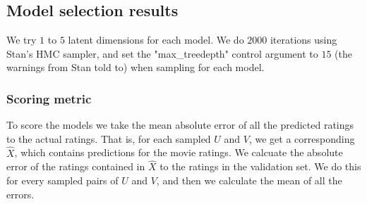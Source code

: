 \documentclass[12pt]{article}
\begin{document}
    \subsection{Model selection results}
    We try $1$ to $5$ latent dimensions for each model. We do $2000$ iterations using Stan's HMC sampler, and set the "max\_treedepth" control argument to $15$ (the warnings from Stan told to) when sampling for each model.

        \subsubsection*{Scoring metric}
        To score the models we take the mean absolute error of all the predicted ratings to the actual ratings. That is, for each sampled $U$ and $V$, we get a corresponding $\hat{X}$, which contains predictions for the movie ratings. We calcuate the absolute error of the ratings contained in $\hat{X}$ to the ratings in the validation set. We do this for every sampled pairs of $U$ and $V$, and then we calculate the mean of all the errors. 
\end{document}
